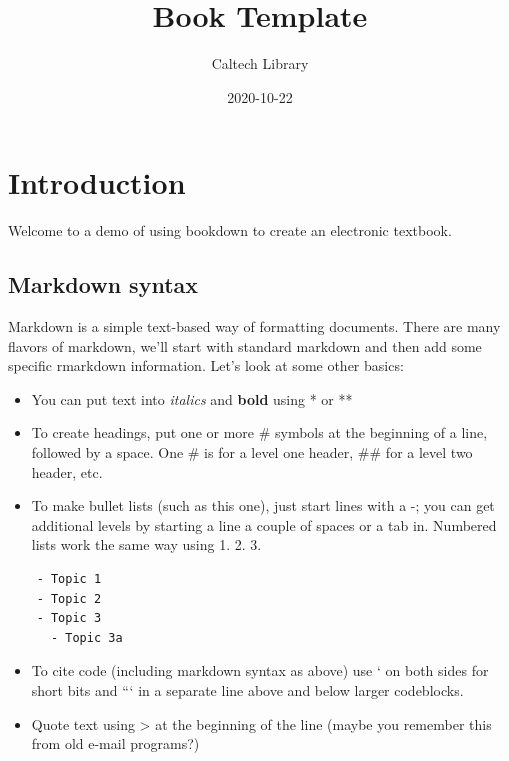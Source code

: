 \documentclass[]{tufte-book}
\title{Book Template}
\author{Caltech Library}
\date{2020-10-22}
\providecommand{\tightlist}{%
  \setlength{\itemsep}{0pt}\setlength{\parskip}{0pt}}
\begin{document}
\maketitle



{
\setcounter{tocdepth}{1}
\tableofcontents
}

\chapter{Introduction}\label{introduction}

Welcome to a demo of using bookdown to create an electronic textbook.

\section{Markdown syntax}\label{markdown-syntax}

Markdown is a simple text-based way of formatting documents. There are
many flavors of markdown, we'll start with standard markdown and then
add some specific rmarkdown information. Let's look at some other
basics:

\begin{itemize}
\tightlist
\item
  You can put text into \emph{italics} and \textbf{bold} using * or **
\item
  To create headings, put one or more \# symbols at the beginning of a
  line, followed by a space. One \# is for a level one header, \#\# for
  a level two header, etc.
\item
  To make bullet lists (such as this one), just start lines with a -;
  you can get additional levels by starting a line a couple of spaces or
  a tab in. Numbered lists work the same way using 1. 2. 3.
\end{itemize}

\begin{verbatim}
    - Topic 1
    - Topic 2  
    - Topic 3
      - Topic 3a
\end{verbatim}

\begin{itemize}
\item
  To cite code (including markdown syntax as above) use ` on both sides
  for short bits and ``` in a separate line above and below larger
  codeblocks.
\item
  Quote text using \textgreater{} at the beginning of the line (maybe
  you remember this from old e-mail programs?)
\end{itemize}
\end{document}
